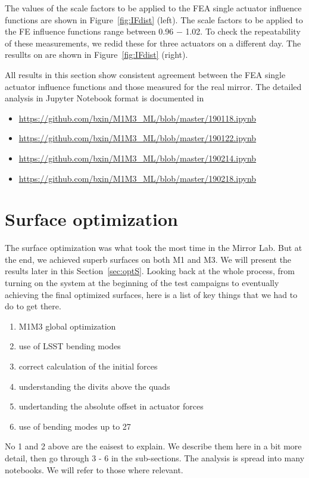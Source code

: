 \documentclass [twoside,openbib,12pt]{article}
\newcommand{\bitm}{\begin{itemize}}
\newcommand{\eitm}{\end{itemize}}
\newcommand{\bnum}{\begin{enumerate}}
\newcommand{\enum}{\end{enumerate}}
\begin{document}
The values of the scale factors to be applied to the FEA single
actuator influence functions are shown in Figure~\ref{fig:IFdist}
(left).
The scale factors to be applied to the FE influence functions range
between 0.96 $-$ 1.02.
To check the repeatability of these measurements, we redid these for
three actuators on a different day. The resullts on are shown in
Figure~\ref{fig:IFdist} (right).

All results in this section show consistent agreement between the FEA single actuator
influence functions and those measured for the real mirror.
The detailed analysis in Jupyter Notebook format is documented in
\bitm
\item \url{https://github.com/bxin/M1M3_ML/blob/master/190118.ipynb}
\item \url{https://github.com/bxin/M1M3_ML/blob/master/190122.ipynb}
\item \url{https://github.com/bxin/M1M3_ML/blob/master/190214.ipynb}
\item \url{https://github.com/bxin/M1M3_ML/blob/master/190218.ipynb}
  \eitm

\section{Surface optimization}

The surface optimization was what took the most time in the Mirror
Lab. But at the end, we achieved superb surfaces on both M1 and M3. We
will present the results later in this Section~\ref{sec:optS}.
Looking back at the whole process, from turning on the system at the
beginning of the test campaigns to eventually
achieving the final optimized surfaces, here is a list of key things
that we had to do to get there.
\bnum
\item M1M3 global optimization
\item use of LSST bending modes
  \item correct calculation of the initial forces 
  \item understanding the divits above the quads
    \item undertanding the absolute offset in actuator forces
  \item use of bending modes up to 27 
\enum

No 1 and 2 above are the eaisest to explain. We describe them here in
a bit more detail, then go through 3 - 6 in the sub-sections.
The analysis is spread into many notebooks. We will refer to those
where relevant.
\end{document}
